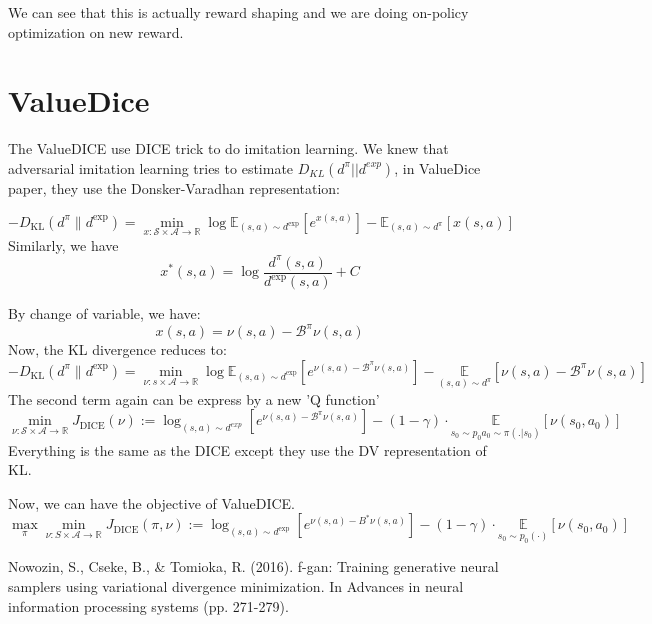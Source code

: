 \documentclass[a4paper]{article}
\theoremstyle{definition}
\begin{document}
We can see that this is actually reward shaping and we are doing on-policy optimization on new reward.

\section{ValueDice}
The ValueDICE use DICE trick to do imitation learning.
We knew that adversarial imitation learning tries to estimate $D_{KL}(d^{\pi}||d^{exp})$, in ValueDice paper, they use the Donsker-Varadhan representation:

\begin{equation}
-D_{\mathrm{KL}}\left(d^{\pi} \| d^{\mathrm{exp}}\right)=\min _{x: \mathcal{S} \times \mathcal{A} \rightarrow \mathbb{R}} \log \mathbb{E}_{(s, a) \sim d^{\mathrm{exp}}}\left[e^{x(s, a)}\right]-\mathbb{E}_{(s, a) \sim d^{\pi}}[x(s, a)]
\end{equation}
Similarly, we have
\begin{equation}
x^{*}(s, a)=\log \frac{d^{\pi}(s, a)}{d^{\exp }(s, a)}+C
\end{equation}

By change of variable, we have:
\begin{equation}
x(s, a)=\nu(s, a)-\mathcal{B}^{\pi} \nu(s, a)
\end{equation}
Now, the KL divergence reduces to:
\begin{equation}
-D_{\mathrm{KL}}\left(d^{\pi} \| d^{\mathrm{exp}}\right)=\min _{\nu: s \times \mathcal{A} \rightarrow \mathbb{R}}  \log \mathbb{E}_{(s, a) \sim d^{\mathrm{exp}}}\left[e^{\nu(s, a)-\mathcal{B}^{\pi} \nu(s, a)}\right]-\underset{(s, a) \sim d^{\pi}}{\mathbb{E}}\left[\nu(s, a)-\mathcal{B}^{\pi} \nu(s, a)\right]
\end{equation}
The second term again can be express by a new 'Q function'
\begin{equation}
\min _{\nu: \mathcal{S} \times \mathcal{A} \rightarrow \mathbb{R}} J_{\mathrm{DICE}}(\nu):=\log _{(s, a) \sim d^{exp}}\left[e^{\nu(s, a)-\mathcal{B}^{\pi} \nu(s, a)}\right]-(1-\gamma) \cdot \underset{s_{0} \sim p_{0} a_0 \sim \pi(.|s_0)}{\mathbb{E}}\left[\nu\left(s_{0}, a_{0}\right)\right]
\end{equation}
Everything is the same as the DICE except they use the DV representation of KL.

Now, we can have the objective of ValueDICE.
\begin{equation}
\max _{\pi} \min _{\nu: S \times \mathcal{A} \rightarrow \mathbb{R}} J_{\mathrm{DICE}}(\pi, \nu):=\log _{(s, a) \sim d^{\mathrm{exp}}}\left[e^{\nu(s, a)-B^{*} \nu(s, a)}\right]-(1-\gamma) \cdot \underset{s_{0} \sim p_{0}(\cdot)}{\mathbb{E}}\left[\nu\left(s_{0}, a_{0}\right)\right]
\end{equation}

\begin{thebibliography}{99}  
Nowozin, S., Cseke, B., \& Tomioka, R. (2016). f-gan: Training generative neural samplers using variational divergence minimization. In Advances in neural information processing systems (pp. 271-279).  

\end{thebibliography}
\end{document}
